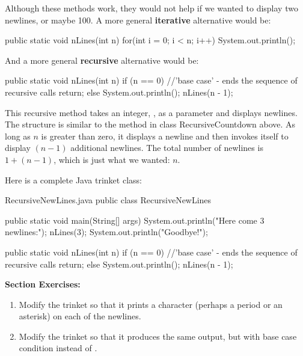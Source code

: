 
Although these methods work, they would not help if we wanted to display two newlines, or maybe 100.
A more general \textbf{iterative} alternative would be:

\begin{code}
public static void nLines(int n) {
    for(int i = 0; i < n; i++) {
       System.out.println();
    }
}
\end{code}

And a more general \textbf{recursive} alternative would be:

\begin{code}
public static void nLines(int n) {
    if (n == 0) { //'base case' - ends the sequence of recursive calls
       return;  
    } else {
       System.out.println();
       nLines(n - 1);
    }
}
\end{code}

This recursive method takes an integer, , as a parameter and displays  newlines.
The structure is similar to the  method in class RecursiveCountdown above.
As long as $n$ is greater than zero, it displays a newline and then invokes itself to display $(n-1)$ additional newlines.
The total number of newlines is $1 + (n - 1)$, which is just what we wanted: $n$.

Here is a complete Java trinket class:

\begin{trinket} [300] {RecursiveNewLines.java}
public class RecursiveNewLines {

    public static void main(String[] args) {
       System.out.println("Here come 3 newlines:");
       nLines(3);
       System.out.println("Goodbye!");
    }
    
    public static void nLines(int n) {
       if (n == 0) {  //'base case' - ends the sequence of recursive calls
          return;  
       } else {
          System.out.println();
          nLines(n - 1);
       }
    }
}
\end{trinket}

\textbf{Section Exercises:}
\begin{enumerate}
\item Modify the trinket so that it prints a character (perhaps a period or an asterisk) on each of the newlines.
\item Modify the trinket so that it produces the same output, but with base case condition  instead of .
\end{enumerate}

